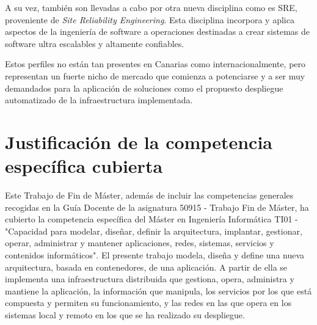 A su vez, también son llevadas a cabo por otra nueva disciplina como es SRE, proveniente de \textit{Site Reliability Engineering}. Esta disciplina incorpora y aplica aspectos de la ingeniería de software a operaciones destinadas a crear sistemas de software ultra escalables y altamente confiables. 

Estos perfiles no están tan presentes en Canarias como internacionalmente, pero representan un fuerte nicho de mercado que comienza a potenciarse y a ser muy demandados para la aplicación de soluciones como el propuesto despliegue automatizado de la infraestructura implementada.

\section{Justificación de la competencia específica cubierta}

Este Trabajo de Fin de Máster, además de incluir las competencias generales recogidas en la Guía Docente de la asignatura 50915 - Trabajo Fin de Máster, ha cubierto la competencia específica del Máster en Ingeniería Informática TI01 - "Capacidad para modelar, diseñar, definir la arquitectura, implantar, gestionar, operar, administrar y mantener aplicaciones, redes, sistemas, servicios y contenidos informáticos". El presente trabajo modela, diseña y define una nueva arquitectura, basada en contenedores, de una aplicación. A partir de ella se implementa una infraestructura distribuida que gestiona, opera, administra y mantiene la aplicación, la información que manipula, los servicios por los que está compuesta y permiten su funcionamiento, y las redes en las que opera en los sistemas local y remoto en los que se ha realizado su despliegue.